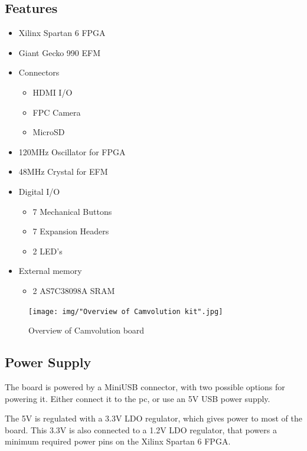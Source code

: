\subsection{Features}
\begin{itemize}
    \item Xilinx Spartan 6 FPGA
    \item Giant Gecko 990 EFM
    \item Connectors
        \begin{itemize}
            \item HDMI I/O
            \item FPC Camera
            \item MicroSD
        \end{itemize}
    \item 120MHz Oscillator for FPGA
    \item 48MHz Crystal for EFM
    \item Digital I/O
        \begin{itemize}
            \item 7 Mechanical Buttons
            \item 7 Expansion Headers
            \item 2 LED's
        \end{itemize}
    \item External memory
        \begin{itemize}
            \item 2 AS7C38098A SRAM
        \end{itemize}

\end{itemize}


\begin{figure}
    \texttt{[image: img/"Overview of Camvolution kit".jpg]}
    \caption{Overview of Camvolution board}
    \label{fig:BoardLayout}
\end{figure}

\subsection{Power Supply}
The board is powered by a MiniUSB connector, with two possible options for powering it. Either connect it to the pc, or use an 5V USB power supply.

The 5V is regulated with a 3.3V LDO regulator, which gives power to most of the board. This 3.3V is also connected to a 1.2V LDO regulator, that powers a minimum required power pins on the Xilinx Spartan 6 FPGA. 

